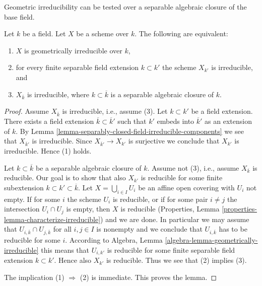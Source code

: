 \begin{lemma}
\label{lemma-characterize-geometrically-irreducible}
\begin{slogan}
Geometric irreducibility can be tested over a separable algebraic
closure of the base field.
\end{slogan}
Let $k$ be a field. Let $X$ be a scheme over $k$.
The following are equivalent:
\begin{enumerate}
\item $X$ is geometrically irreducible over $k$,
\item for every finite separable field extension $k \subset k'$
the scheme $X_{k'}$ is irreducible, and
\item $X_{\overline{k}}$ is irreducible, where $k \subset \overline{k}$
is a separable algebraic closure of $k$.
\end{enumerate}
\end{lemma}

\begin{proof}
Assume $X_{\overline{k}}$ is irreducible, i.e., assume (3).
Let $k \subset k'$ be a field extension.
There exists a field extension $\overline{k} \subset \overline{k}'$
such that $k'$ embeds into $\overline{k}'$ as an extension of $k$.
By Lemma \ref{lemma-separably-closed-field-irreducible-components}
we see that $X_{\overline{k}'}$ is irreducible.
Since $X_{\overline{k}'} \to X_{k'}$ is surjective we conclude
that $X_{k'}$ is irreducible. Hence (1) holds.

\medskip\noindent
Let $k \subset \overline{k}$ be a separable algebraic closure of $k$.
Assume not (3), i.e., assume $X_{\overline{k}}$ is reducible.
Our goal is to show that also $X_{k'}$ is
reducible for some finite subextension
$k \subset k' \subset \overline{k}$.
Let $X = \bigcup_{i \in I} U_i$ be an affine open covering
with $U_i$ not empty. If for some $i$ the scheme
$U_i$ is reducible, or if for some pair $i \not = j$ the
intersection $U_i \cap U_j$ is empty, then $X$ is reducible
(Properties, Lemma \ref{properties-lemma-characterize-irreducible})
and we are done.
In particular we may assume that
$U_{i, \overline{k}} \cap U_{j, \overline{k}}$ for all $i, j \in I$
is nonempty and we conclude that $U_{i, \overline{k}}$ has
to be reducible for some $i$. According to
Algebra, Lemma \ref{algebra-lemma-geometrically-irreducible}
this means that $U_{i, k'}$ is reducible for some
finite separable field extension $k \subset k'$.
Hence also $X_{k'}$ is reducible. Thus we see that
(2) implies (3).

\medskip\noindent
The implication (1) $\Rightarrow$ (2) is immediate.
This proves the lemma.
\end{proof}

